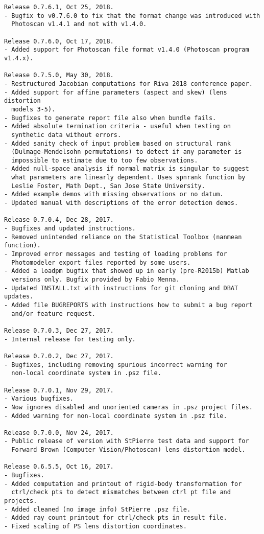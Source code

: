 \documentclass{article}
\begin{document}
\begin{verbatim}
Release 0.7.6.1, Oct 25, 2018.
- Bugfix to v0.7.6.0 to fix that the format change was introduced with
  Photoscan v1.4.1 and not with v1.4.0.

Release 0.7.6.0, Oct 17, 2018.
- Added support for Photoscan file format v1.4.0 (Photoscan program v1.4.x).

Release 0.7.5.0, May 30, 2018.
- Restructured Jacobian computations for Riva 2018 conference paper.
- Added support for affine parameters (aspect and skew) (lens distortion
  models 3-5).
- Bugfixes to generate report file also when bundle fails.
- Added absolute termination criteria - useful when testing on
  synthetic data without errors.
- Added sanity check of input problem based on structural rank
  (Dulmage-Mendelsohn permutations) to detect if any parameter is
  impossible to estimate due to too few observations.
- Added null-space analysis if normal matrix is singular to suggest
  what parameters are linearly dependent. Uses spnrank function by
  Leslie Foster, Math Dept., San Jose State University.
- Added example demos with missing observations or no datum.
- Updated manual with descriptions of the error detection demos.

Release 0.7.0.4, Dec 28, 2017.
- Bugfixes and updated instructions.
- Removed unintended reliance on the Statistical Toolbox (nanmean function).
- Improved error messages and testing of loading problems for
  Photomodeler export files reported by some users.
- Added a loadpm bugfix that showed up in early (pre-R2015b) Matlab
  versions only. Bugfix provided by Fabio Menna.
- Updated INSTALL.txt with instructions for git cloning and DBAT updates.
- Added file BUGREPORTS with instructions how to submit a bug report
  and/or feature request.

Release 0.7.0.3, Dec 27, 2017.
- Internal release for testing only.

Release 0.7.0.2, Dec 27, 2017.
- Bugfixes, including removing spurious incorrect warning for
  non-local coordinate system in .psz file.

Release 0.7.0.1, Nov 29, 2017.
- Various bugfixes.
- Now ignores disabled and unoriented cameras in .psz project files.
- Added warning for non-local coordinate system in .psz file.

Release 0.7.0.0, Nov 24, 2017.
- Public release of version with StPierre test data and support for
  Forward Brown (Computer Vision/Photoscan) lens distortion model.

Release 0.6.5.5, Oct 16, 2017.
- Bugfixes.
- Added computation and printout of rigid-body transformation for
  ctrl/check pts to detect mismatches between ctrl pt file and projects.
- Added cleaned (no image info) StPierre .psz file.
- Added ray count printout for ctrl/check pts in result file.
- Fixed scaling of PS lens distortion coordinates.


\end{verbatim}
\end{document}
